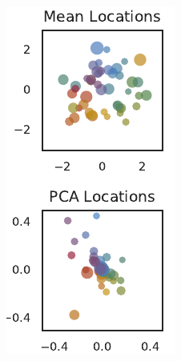 \begin{figure}[t!]
\begin{center}
\begin{subfigure}[T]{1.4in}
      \includegraphics[width=\textwidth]{figures/ch3/hipp_mean_pca_locations} 
      \label{fig:hipp_mean_and_pca_locations}
    \end{subfigure}

\end{center}
\end{figure}
